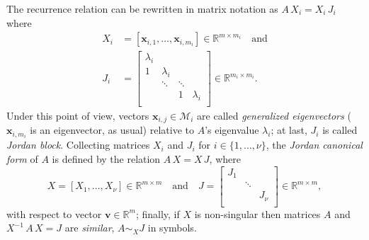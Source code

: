 The recurrence relation can be rewritten in matrix notation as $A\,X_{i} = X_{i}\,J_{i}$ where
\begin{displaymath}
\begin{split}
X_{i}   &= \left[\boldsymbol{x}_{i,1},\ldots,\boldsymbol{x}_{i,m_{i}} \right]\in\mathbb{R}^{m\times m_{i}}\quad\text{and} \\
J_{i}   &= \left[ \begin{array}{cccc}
    \lambda_{i} \\
    1 & \lambda_{i} \\
      & \ddots & \ddots \\
      & & 1 &\lambda_{i} \\
\end{array} \right] \in\mathbb{R}^{m_{i}\times m_{i}}.
\end{split}
\end{displaymath}
Under this point of view, vectors $\boldsymbol{x}_{i,j}\in\mathcal{M}_{i}$ are
called \textit{generalized eigenvectors} ($\boldsymbol{x}_{i,m_{i}}$ is an
eigenvector, as usual) relative to $A$'s eigenvalue $\lambda_{i}$; at last,
$J_{i}$ is called \textit{Jordan block}.  Collecting matrices $X_{i}$ and
$J_{i}$ for $i\in \lbrace 1,\ldots,\nu \rbrace$, the \textit{Jordan canonical
form} of $A$ is defined by the relation $A\,X = X\, J$, where
\begin{displaymath}
X = \left[X_{1},\ldots,X_{\nu} \right]\in\mathbb{R}^{m\times m} \quad\text{and}\quad
J = \left[ \begin{array}{ccc}
    J_{1} \\
      & \ddots \\
      & & J_{\nu} \\
\end{array} \right] \in\mathbb{R}^{m\times m},
\end{displaymath}
with respect to vector $\boldsymbol{v}\in\mathbb{R}^{m}$; finally, if $X$ is
non-singular then matrices $A$ and $X^{-1}\,A\,X = J$ are \textit{similar}, $A
\sim_{X} J$ in symbols.

